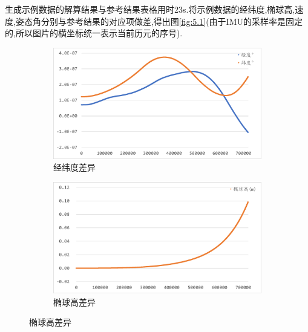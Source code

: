 \documentclass[10pt,a4paper]{ctexart}
\begin{document}
生成示例数据的解算结果与参考结果表格用时23s.将示例数据的经纬度,椭球高,速度,姿态角分别与参考结果的对应项做差,得出图\ref{fig:5.1}(由于\textsf{IMU}的采样率是固定的,所以图片的横坐标统一表示当前历元的序号).
\begin{figure}[H]
    \centering
    {
        \begin{subfigure}{0.49\textwidth}
            \centering
            \includegraphics[width=\linewidth]{Figures/DataFigure/示例数据经纬度差异.png}
            \caption*{经纬度差异}
        \end{subfigure}\hfill
        \begin{subfigure}{0.49\textwidth}
            \centering
            \includegraphics[width=\linewidth]{Figures/DataFigure/示例数据椭球高差异.png}
            \caption*{椭球高差异}
        \end{subfigure}
        
}
\end{figure}
\end{document}
